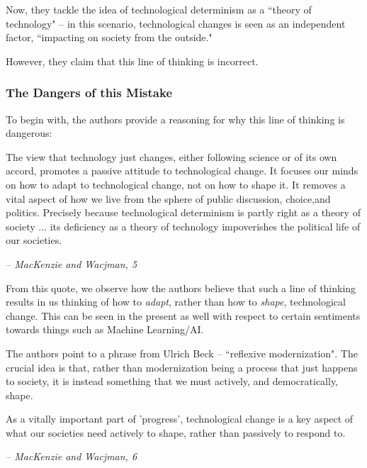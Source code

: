 \documentclass[openany]{book}
\begin{document}
Now, they tackle the idea of technological determinism as a ``theory of technology" -- in this scenario, technological changes is seen as an independent factor, ``impacting on society from the outside."

However, they claim that this line of thinking is incorrect.

\subsubsection{The Dangers of this Mistake}
To begin with, the authors provide a reasoning for why this line of thinking is dangerous:

\begin{fancyquotes}
	The view that technology just changes, either following science or of its own accord, promotes a passive attitude to technological change. It focuses our minds on how to adapt to technological change, not on how to shape it. It removes a vital aspect of how we live from the sphere of public discussion, choice,and politics. Precisely because technological determinism is partly right as a theory of society ... its deficiency as a theory of technology impoverishes the political life of our societies.
	
	\begin{flushright}
		\emph{-- MacKenzie and Wacjman, 5}
	\end{flushright}
\end{fancyquotes}

From this quote, we observe how the authors believe that such a line of thinking results in us thinking of how to \textit{adapt}, rather than how to \textit{shape}, technological change. This can be seen in the present as well with respect to certain sentiments towards things such as Machine Learning/AI.

\begin{example}
	The authors point to a phrase from Ulrich Beck -- ``reflexive modernization". The crucial idea is that, rather than modernization being a process that just happens to society, it is instead something that we must actively, and democratically, shape.
\end{example}

\begin{fancyquotes}
	As a vitally important part of 'progress', technological change is a key aspect of what our societies need actively to shape, rather than passively to respond to.
	
	\begin{flushright}
		\emph{-- MacKenzie and Wacjman, 6}
	\end{flushright}
\end{fancyquotes}
\end{document}
